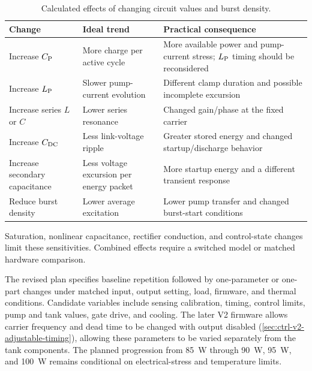 \begin{table}[H]
\centering
\caption{Calculated effects of changing circuit values and burst density.}
\label{tab:sim-analytical-sensitivity}
\begin{tabularx}{\textwidth}{@{}L{0.25\textwidth}L{0.30\textwidth}Y@{}}
\toprule
Change & Ideal trend & Practical consequence\\
\midrule
Increase \(C_{\mathrm{P}}\) & More charge per active cycle & More available power and pump-current stress; \(L_{\mathrm{P}}\) timing should be reconsidered\\
Increase \(L_{\mathrm{P}}\) & Slower pump-current evolution & Different clamp duration and possible incomplete excursion\\
Increase series \(L\) or \(C\) & Lower series resonance & Changed gain/phase at the fixed carrier\\
Increase \(C_{\mathrm{DC}}\) & Less link-voltage ripple & Greater stored energy and changed startup/discharge behavior\\
Increase secondary capacitance & Less voltage excursion per energy packet & More startup energy and a different transient response\\
Reduce burst density & Lower average excitation & Lower pump transfer and changed burst-start conditions\\
\bottomrule
\end{tabularx}
\end{table}

Saturation, nonlinear capacitance, rectifier conduction, and control-state changes limit these sensitivities. Combined effects require a switched model or matched hardware comparison.

The revised plan \cite{projectOctoberPlan} specifies baseline repetition followed by one-parameter or one-part changes under matched input, output setting, load, firmware, and thermal conditions. Candidate variables include sensing calibration, timing, control limits, pump and tank values, gate drive, and cooling. The later V2 firmware allows carrier frequency and dead time to be changed with output disabled (\cref{sec:ctrl-v2-adjustable-timing}), allowing these parameters to be varied separately from the tank components. The planned progression from \SI{85}{\watt} through \SI{90}{\watt}, \SI{95}{\watt}, and \SI{100}{\watt} remains conditional on electrical-stress and temperature limits.
